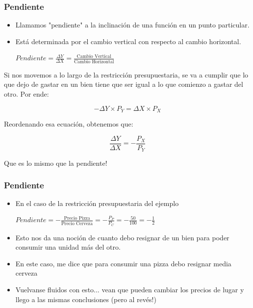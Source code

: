 \documentclass{beamer}
\begin{document}
\begin{frame}
\frametitle{Pendiente}
\begin{itemize}
    \item Llamamos "pendiente" a la inclinación de una función en un punto particular.
    \item Está determinada por el cambio vertical con respecto al cambio horizontal. \\ \vspace{2mm}
    \begin{center}
        $Pendiente =\frac{\Delta Y}{\Delta X} = \frac{\text{Cambio Vertical}}
    {\text{Cambio Horizontal}}$
    \end{center}
\end{itemize} 
Si nos movemos a lo largo de la restricción presupuestaria, se va a cumplir que lo que dejo de gastar en un bien tiene que ser igual a lo que comienzo a gastar del otro. Por ende:
\begin{center}
    \[-\Delta Y \times P_Y = \Delta X \times P_X \]
\end{center}
Reordenando esa ecuación, obtenemos que:
\begin{center}
    \[\frac{\Delta Y}{\Delta X} = -\frac{P_X}{P_Y} \]
\end{center}
Que es lo mismo que la pendiente!

\end{frame}

\begin{frame}
\frametitle{Pendiente}
    \begin{itemize}
        \item En el caso de la restricción presupuestaria del ejemplo \\
        \begin{center}
            $Pendiente = - \frac{\text{Precio Pizza}}{\text{Precio Cerveza}}= -\frac{P_P}{P_C} = -\frac{50}{100} = -\frac{1}{2}$
        \end{center}
        \item Esto nos da una noción de cuanto debo resignar de un bien para poder consumir una unidad más del otro.
        \item En este caso, me dice que para consumir una pizza debo resignar media cerveza
        \item Vuelvanse fluidos con esto... vean que pueden cambiar los precios de lugar y llego a las mismas conclusiones (pero al revés!)
    \end{itemize}
\end{frame}
\end{document}
